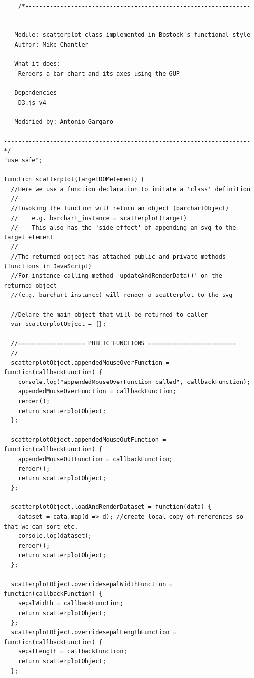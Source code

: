 \documentclass[a4paper, 11pt]{article}
\begin{document}
\begin{verbatim}
    
    /*--------------------------------------------------------------------

   Module: scatterplot class implemented in Bostock's functional style
   Author: Mike Chantler

   What it does:
  	Renders a bar chart and its axes using the GUP

   Dependencies
  	D3.js v4

   Modified by: Antonio Gargaro

---------------------------------------------------------------------- */
"use safe";

function scatterplot(targetDOMelement) {
  //Here we use a function declaration to imitate a 'class' definition
  //
  //Invoking the function will return an object (barchartObject)
  //    e.g. barchart_instance = scatterplot(target)
  //    This also has the 'side effect' of appending an svg to the target element
  //
  //The returned object has attached public and private methods (functions in JavaScript)
  //For instance calling method 'updateAndRenderData()' on the returned object
  //(e.g. barchart_instance) will render a scatterplot to the svg

  //Delare the main object that will be returned to caller
  var scatterplotObject = {};

  //=================== PUBLIC FUNCTIONS =========================
  //
  scatterplotObject.appendedMouseOverFunction = function(callbackFunction) {
    console.log("appendedMouseOverFunction called", callbackFunction);
    appendedMouseOverFunction = callbackFunction;
    render();
    return scatterplotObject;
  };

  scatterplotObject.appendedMouseOutFunction = function(callbackFunction) {
    appendedMouseOutFunction = callbackFunction;
    render();
    return scatterplotObject;
  };

  scatterplotObject.loadAndRenderDataset = function(data) {
    dataset = data.map(d => d); //create local copy of references so that we can sort etc.
    console.log(dataset);
    render();
    return scatterplotObject;
  };

  scatterplotObject.overridesepalWidthFunction = function(callbackFunction) {
    sepalWidth = callbackFunction;
    return scatterplotObject;
  };
  scatterplotObject.overridesepalLengthFunction = function(callbackFunction) {
    sepalLength = callbackFunction;
    return scatterplotObject;
  };


\end{verbatim}
\end{document}

